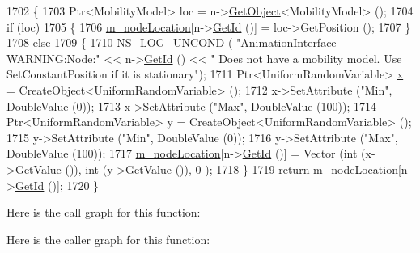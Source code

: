 \begin{DoxyCode}
1702 \{
1703   Ptr<MobilityModel> loc = n->\hyperlink{classns3_1_1Object_a13e18c00017096c8381eb651d5bd0783}{GetObject}<MobilityModel> ();
1704   \textcolor{keywordflow}{if} (loc)
1705     \{
1706       \hyperlink{classns3_1_1AnimationInterface_a4ff501bdb4d16525b521e7f42fe563f4}{m\_nodeLocation}[n->\hyperlink{classns3_1_1Node_aaf49b64a843565ce3812326313b370ac}{GetId} ()] = loc->GetPosition ();
1707     \}
1708   \textcolor{keywordflow}{else}
1709    \{
1710      \hyperlink{log-macros-disabled_8h_a0b36e5e182b37194f85ef1c5e979fb2e}{NS\_LOG\_UNCOND} ( \textcolor{stringliteral}{"AnimationInterface WARNING:Node:"} << n->\hyperlink{classns3_1_1Node_aaf49b64a843565ce3812326313b370ac}{GetId} () << \textcolor{stringliteral}{" Does not have
       a mobility model. Use SetConstantPosition if it is stationary"});
1711      Ptr<UniformRandomVariable> \hyperlink{lte__link__budget__x2__handover__measures_8m_a9336ebf25087d91c818ee6e9ec29f8c1}{x} = CreateObject<UniformRandomVariable> ();
1712      x->SetAttribute (\textcolor{stringliteral}{"Min"}, DoubleValue (0));
1713      x->SetAttribute (\textcolor{stringliteral}{"Max"}, DoubleValue (100));
1714      Ptr<UniformRandomVariable> y = CreateObject<UniformRandomVariable> ();
1715      y->SetAttribute (\textcolor{stringliteral}{"Min"}, DoubleValue (0));
1716      y->SetAttribute (\textcolor{stringliteral}{"Max"}, DoubleValue (100));
1717      \hyperlink{classns3_1_1AnimationInterface_a4ff501bdb4d16525b521e7f42fe563f4}{m\_nodeLocation}[n->\hyperlink{classns3_1_1Node_aaf49b64a843565ce3812326313b370ac}{GetId} ()] = Vector (\textcolor{keywordtype}{int} (x->GetValue ()), \textcolor{keywordtype}{int} (y->GetValue ()), 0
      );
1718    \}
1719   \textcolor{keywordflow}{return} \hyperlink{classns3_1_1AnimationInterface_a4ff501bdb4d16525b521e7f42fe563f4}{m\_nodeLocation}[n->\hyperlink{classns3_1_1Node_aaf49b64a843565ce3812326313b370ac}{GetId} ()];
1720 \}
\end{DoxyCode}


Here is the call graph for this function\+:




Here is the caller graph for this function\+:


